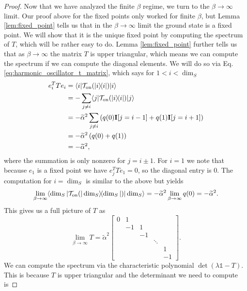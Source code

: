\documentclass{article}
\newcommand{\on}{\rm on}
\newcommand{\ket}[1]{|#1\rangle}
\newcommand{\bra}[1]{\langle #1|}
\newcommand{\ketbra}[2]{| #1\rangle\! \langle #2|}
\newcommand{\TT}{\mathcal{T}}
\newcommand{\identity}{\mathds{1}}
\begin{document}
\begin{proof}
    Now that we have analyzed the finite $\beta$ regime, we turn to the $\beta \to \infty$ limit. Our proof above for the fixed points only worked for finite $\beta$, but Lemma \ref{lem:fixed_point} tells us that in the $\beta \to \infty$ limit the ground state is a fixed point. We will show that it is the unique fixed point by computing the spectrum of $T$, which will be rather easy to do. Lemma \ref{lem:fixed_point} further tells us that as $\beta \to \infty$ the matrix $T$ is upper triangular, which means we can compute the spectrum if we can compute the diagonal elements. We will do so via Eq. \ref{eq:harmonic_oscillator_t_matrix}, which says for $1 < i < \dim_S$
    \begin{align}
        e_i^T T e_i &= \bra{i} \TT_{\on}(\ketbra{i}{i}) \ket{i} \\
        &= -\sum_{j \neq i} \bra{j} \TT_{\on}(\ketbra{i}{i}) \ket{j} \\
        &= - \widetilde{\alpha}^2 \sum_{j \neq i} \left(q(0) \mathbf{I}[j = i - 1] +  q(1) \mathbf{I}[j = i + 1] \right) \\
        &= -\widetilde{\alpha}^2 \left(q(0) + q(1) \right) \\
        &= - \widetilde{\alpha}^2,
    \end{align}
    where the summation is only nonzero for $j = i \pm 1$. For $i = 1$ we note that because $e_1$ is a fixed point we have $e_j^T T e_1 = 0$, so the diagonal entry is 0. The computation for $i = \dim_S$ is similar to the above but yields 
    \begin{equation}
        \lim_{\beta \to \infty} \bra{\dim_S} \TT_{\on}(\ketbra{\dim_S}{\dim_S}) \ket{\dim_S} = -\widetilde{\alpha}^2 \lim_{\beta \to \infty}  q(0) = - \widetilde{\alpha}^2.
    \end{equation}
    This gives us a full picture of $T$ as 
\begin{equation}
    \lim_{\beta \to \infty} T = \widetilde{\alpha}^2 \begin{bmatrix}
        0 & 1 &   &\\
        & -1 & 1 &  &\\
        & & -1  & & \\
        & & & \ddots & \\
        & &     &       & 1 \\
        & &  & & -1
    \end{bmatrix}.
\end{equation}
We can compute the spectrum via the characteristic polynomial $\det(\lambda \identity - T)$. This is because $T$ is upper triangular and the determinant we need to compute is

\end{proof}
\end{document}

